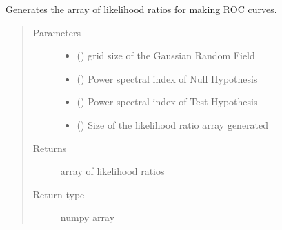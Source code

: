 \documentclass[letterpaper,10pt,english]{sphinxmanual}
\begin{document}
\begin{fulllineitems}
\label{\detokenize{utilities:utilities.Generate_Likelihood_Array}}
\sphinxAtStartPar
Generates the array of likelihood ratios for making ROC curves.
\begin{quote}\begin{description}
\item[{Parameters}] \leavevmode\begin{itemize}
\item {} 
\sphinxAtStartPar
{} () \textendash{} grid size of the Gaussian Random Field

\item {} 
\sphinxAtStartPar
{} () \textendash{} Power spectral index of Null Hypothesis

\item {} 
\sphinxAtStartPar
{} () \textendash{} Power spectral index of Test Hypothesis

\item {} 
\sphinxAtStartPar
{} () \textendash{} Size of the likelihood ratio array generated

\end{itemize}

\item[{Returns}] \leavevmode
\sphinxAtStartPar
array of likelihood ratios

\item[{Return type}] \leavevmode
\sphinxAtStartPar
numpy array

\end{description}\end{quote}

\end{fulllineitems}

\end{document}
